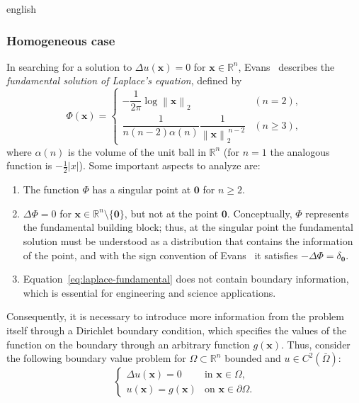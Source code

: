 \documentclass[11pt,letterpaper,twoside,openright]{book} %
\newcommand{\norm}[1]{\left\lVert #1 \right\rVert}
\newcommand{\abs}[1]{\left\lvert #1 \right\rvert}
\begin{document}
\begin{hyphenrules}{english}
\subsubsection{Homogeneous case}
In searching for a solution to $\Delta u(\mathbf{x})=0$ for $\mathbf{x}\in\mathbb{R}^n$, Evans~\cite{evans2010} describes the
\emph{fundamental solution of Laplace's equation}, defined by
\begin{equation}
  \Phi(\mathbf{x})=
  \begin{cases}
    -\dfrac{1}{2\pi}\log\norm{\mathbf{x}}_2 & (n=2),\\[2mm]
    \dfrac{1}{n(n-2)\alpha(n)}\dfrac{1}{\norm{\mathbf{x}}_2^{\,n-2}} & (n\ge3),
  \end{cases}
  \label{eq:laplace-fundamental}
\end{equation}
where $\alpha(n)$ is the volume of the unit ball in $\mathbb{R}^n$ (for $n=1$ the analogous function is
$-\tfrac12\abs{x}$). Some important aspects to analyze are:
\begin{enumerate}
  \item The function $\Phi$ has a singular point at $\mathbf{0}$ for $n\ge2$.
  \item $\Delta\Phi=0$ for $\mathbf{x}\in\mathbb{R}^n\setminus\{\mathbf{0}\}$, but not at the point $\mathbf{0}$.
    Conceptually, $\Phi$ represents the fundamental building block; thus, at the singular point the
    fundamental solution must be understood as a distribution that contains the information of the
    point, and with the sign convention of Evans~\cite{evans2010} it satisfies $-\Delta\Phi=\delta_{\mathbf{0}}$.
  \item Equation~\eqref{eq:laplace-fundamental} does not contain boundary information, which is essential for
    engineering and science applications.
\end{enumerate}

Consequently, it is necessary to introduce more information from the problem itself through a
Dirichlet boundary condition, which specifies the values of the function on the boundary through an
arbitrary function $g(\mathbf{x})$. Thus, consider the following boundary value problem for
$\Omega\subset\mathbb{R}^n$ bounded and $u\in C^2(\bar\Omega)$:
\begin{equation}
  \begin{cases}
    \Delta u(\mathbf{x})=0 & \text{in } \mathbf{x}\in\Omega,\\
    u(\mathbf{x})=g(\mathbf{x}) & \text{on } \mathbf{x}\in\partial\Omega.
  \end{cases}
  \label{eq:laplace-dirichlet}
\end{equation}


\end{hyphenrules}
\end{document}
